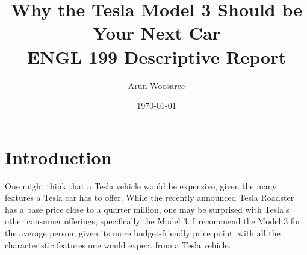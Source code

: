 \documentclass{article}
\title{Why the Tesla Model 3 Should be Your Next Car\\
\vspace{.25cm}\large ENGL 199 Descriptive Report \vspace{-.5cm}}
\author{\LARGE Arun Woosaree}
\date{\today}
\begin{document}
  \maketitle %

  \section{Introduction}
  One might think that a Tesla vehicle would be expensive, given the many
  features a Tesla car has to offer. While the recently announced Tesla Roadster
  has a base price close to a quarter million\cite{teslaroadster}, one may be
  surprised with Tesla's other consumer offerings, specifically the Model 3.
  I recommend the Model 3 for the average person,
  given its more budget-friendly price point, with all the characteristic features
  one would expect from a Tesla vehicle.
  \newpage
\end{document}
